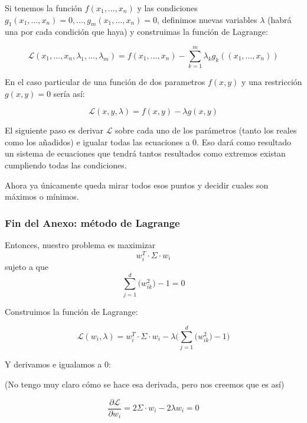 Si tenemos la función $f(x_1,\dots,x_n)$ y las condiciones $g_1(x_1,\dots,x_n) = 0, \dots, g_m(x_1,\dots,x_n) = 0$, definimos nuevas variables $\lambda$ (habrá una por cada condición que haya) y construimas la función de Lagrange:

\begin{equation*}
  \mathcal{L}(x_1,\dots,x_n,\lambda_1,\dots, \lambda_m) = f(x_1,\dots,x_n) - \sum_{k = 1}^{m} \lambda_kg_k((x_1,\dots,x_n))
\end{equation*}

En el caso particular de una función de dos parametros $f(x,y)$ y una restricción $g(x,y) = 0$ sería así:

\begin{equation*}
  \mathcal{L}(x,y,\lambda) = f(x,y) - \lambda g(x,y)
\end{equation*}

El siguiente paso es derivar $\mathcal{L}$ sobre cada uno de los parámetros (tanto los reales como los añadidos) e igualar todas las ecuaciones a $0$. Eso dará como resultado un sistema de ecuaciones que tendrá tantos resultados como extremos existan cumpliendo todas las condiciones.

Ahora ya únicamente queda mirar todos esos puntos y decidir cuales son máximos o mínimos.

\subsubsection*{Fin del Anexo: método de Lagrange}

Entonces, nuestro problema es maximizar
\begin{equation*}
    w_i^T \cdot \Sigma \cdot w_i
\end{equation*}
sujeto a que
\begin{equation*}
\sum_{j = 1}^d \big( w_{ik}^2 \big) -1 = 0
\end{equation*}

Construimos la función de Lagrange:

\begin{equation*}
  \mathcal{L}(w_i,\lambda) = w_i^T \cdot \Sigma \cdot w_i - \lambda \Big( \sum_{j = 1}^d \big( w_{ik}^2 \big) -1\Big)
\end{equation*}

Y derivamos e igualamos a 0:

(No tengo muy claro cómo se hace esa derivada, pero nos creemos que es así)

\begin{equation*}
  \frac{\partial \mathcal{L}}{\partial w_i} = 2\Sigma \cdot w_i - 2\lambda w_i = 0
\end{equation*}

